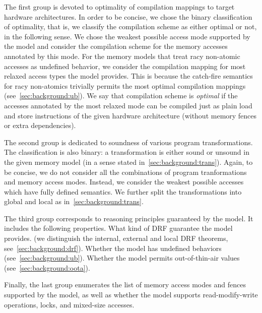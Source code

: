 The first group is devoted to optimality of compilation mappings
to target hardware architectures. In order to be concise, 
we chose the binary classification of optimality, 
that is, we classify the compilation scheme as either optimal or not,
in the following sense.
We chose the weakest possible access mode supported by the model
and consider the compilation scheme for the memory accesses annotated by this mode. 
For the memory models that treat racy non-atomic accesses
as undefined behavior, we consider the compilation mapping
for most relaxed access types the model provides.
This is because the catch-fire semantics for racy non-atomics 
trivially permits the most optimal compilation mappings (see~\cref{sec:background:ub}).
We say that compilation scheme is \emph{optimal} if the 
accesses annotated by the most relaxed mode 
can be compiled just as plain load and store instructions 
of the given hardware architecture (\ie without memory fences or extra dependencies). 

The second group is dedicated to soundness of various program transformations. 
The classification is also binary: a transformation is either sound or unsound 
in the given memory model (in a sense stated in~\cref{sec:background:trans}).
Again, to be concise, we do not consider all the combinations 
of program tranformations and memory access modes. 
Instead, we consider the weakest possible accesses which have fully defined semantics. 
We further split the transformations into global and local as in~\cref{sec:background:trans}.

The third group corresponds to reasoning principles guaranteed by the model. 
It includes the following properties. What kind of DRF guarantee the model provides.
(we distinguish the internal, external and local DRF theorems, see~\cref{sec:background:drf}).
Whether the model has undefined behaviors (see~\cref{sec:background:ub}).
Whether the model permits out-of-thin-air values (see~\cref{sec:background:oota}).

Finally, the last group enumerates the list of memory access modes 
and fences supported by the model, as well as whether the model 
supports read-modify-write operations, locks, and mixed-size accesses.